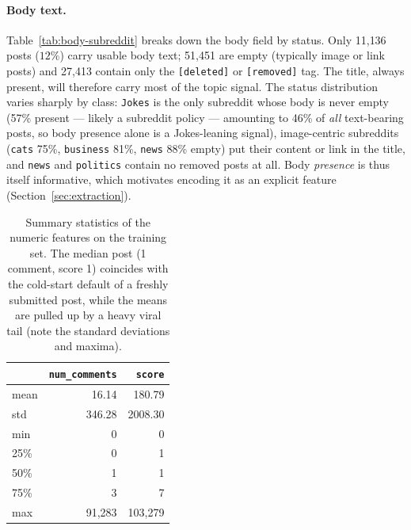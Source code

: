 \documentclass[11pt,a4paper]{article}
\begin{document}
\paragraph{Body text.}
Table~\ref{tab:body-subreddit} breaks down the body field by status. Only
11{,}136 posts ($12\%$) carry usable body text; 51{,}451 are empty (typically
image or link posts) and 27{,}413 contain only the \texttt{[deleted]} or
\texttt{[removed]} tag. The title, always present, will therefore carry most
of the topic signal. The status distribution varies sharply by class:
\texttt{Jokes} is the only subreddit whose body is never empty (57\% present
--- likely a subreddit policy --- amounting to 46\% of \emph{all} text-bearing
posts, so body presence alone is a Jokes-leaning signal), image-centric
subreddits (\texttt{cats} 75\%, \texttt{business} 81\%, \texttt{news} 88\%
empty) put their content or link in the title, and \texttt{news} and
\texttt{politics} contain no removed posts at all. Body \emph{presence} is
thus itself informative, which motivates encoding it as an explicit feature
(Section~\ref{sec:extraction}).

\begin{table}[h]\centering\small
\caption{Summary statistics of the numeric features on the training set. The median post (1 comment, score 1) coincides with the cold-start default of a freshly submitted post, while the means are pulled up by a heavy viral tail (note the standard deviations and maxima).}
\label{tab:numeric-describe}
\begin{tabular}{lrr}\toprule & \texttt{num\_comments} & \texttt{score}\\\midrule
mean  & 16.14 & 180.79\\
std   & 346.28 & 2008.30\\
min   & 0 & 0\\25\%  & 0 & 1\\50\%  & 1 & 1\\75\%  & 3 & 7\\
max   & 91{,}283 & 103{,}279\\\bottomrule
\end{tabular}
\end{table}
\end{document}
